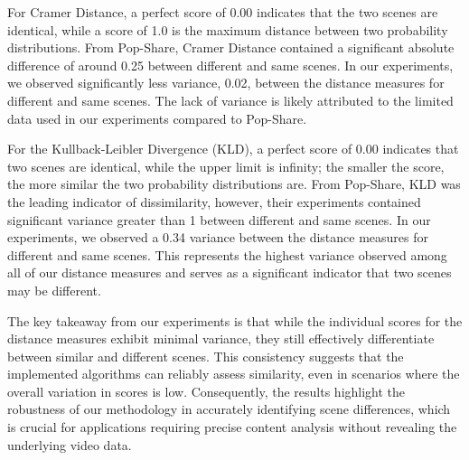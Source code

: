 For Cramer Distance, a perfect score of 0.00 indicates that the two scenes are identical, while a score of 1.0 is the maximum distance between two probability distributions. From Pop-Share, Cramer Distance contained a significant absolute difference of around 0.25 between different and same scenes. In our experiments, we observed significantly less variance, 0.02, between the distance measures for different and same scenes. The lack of variance is likely attributed to the limited data used in our experiments compared to Pop-Share. 

For the Kullback-Leibler Divergence (KLD), a perfect score of 0.00 indicates that two scenes are identical, while the upper limit is infinity; the smaller the score, the more similar the two probability distributions are. From Pop-Share, KLD was the leading indicator of dissimilarity, however, their experiments contained significant variance greater than 1 between different and same scenes. In our experiments, we observed a 0.34 variance between the distance measures for different and same scenes. This represents the highest variance observed among all of our distance measures and serves as a significant indicator that two scenes may be different.

The key takeaway from our experiments is that while the individual scores for the distance measures exhibit minimal variance, they still effectively differentiate between similar and different scenes. This consistency suggests that the implemented algorithms can reliably assess similarity, even in scenarios where the overall variation in scores is low. Consequently, the results highlight the robustness of our methodology in accurately identifying scene differences, which is crucial for applications requiring precise content analysis without revealing the underlying video data.
